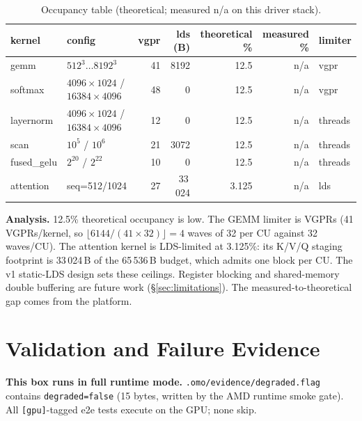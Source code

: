 \documentclass[10pt,twoside]{article}
\begin{document}
\begin{table}[H]
\centering
\caption{Occupancy table (theoretical; measured n/a on this driver stack).}
\label{tab:occ}
\begin{tabular}{@{}llrrrrl@{}}
\toprule
kernel & config & vgpr & lds (B) & theoretical \% & measured \% & limiter \\
\midrule
gemm & $512^3\dots 8192^3$ & 41 & 8192 & 12.5 & n/a & vgpr \\
softmax & $4096\times1024$ / $16384\times4096$ & 48 & 0 & 12.5 & n/a & vgpr \\
layernorm & $4096\times1024$ / $16384\times4096$ & 12 & 0 & 12.5 & n/a & threads \\
scan & $10^5$ / $10^6$ & 21 & 3072 & 12.5 & n/a & threads \\
fused\_gelu & $2^{20}$ / $2^{22}$ & 10 & 0 & 12.5 & n/a & threads \\
attention & seq=512/1024 & 27 & 33\,024 & 3.125 & n/a & lds \\
\bottomrule
\end{tabular}
\end{table}

\textbf{Analysis.} 12.5\% theoretical occupancy is low. The GEMM limiter is VGPRs (41
VGPRs/kernel, so $\lfloor 6144/(41\times32)\rfloor = 4$ waves of 32 per CU against 32
waves/CU). The attention kernel is LDS-limited at 3.125\%: its K/V/Q staging footprint is
33\,024\,B of the 65\,536\,B budget, which admits one block per CU. The v1 static-LDS
design sets these ceilings. Register blocking and shared-memory double buffering are future
work (\S\ref{sec:limitations}). The measured-to-theoretical gap comes from the platform.

\section{Validation and Failure Evidence}
\label{sec:validation}

\textbf{This box runs in full runtime mode.} \texttt{.omo/evidence/degraded.flag} contains
\texttt{degraded=false} (15 bytes, written by the AMD runtime smoke gate). All
\texttt{[gpu]}-tagged e2e tests execute on the GPU; none skip.
\end{document}
